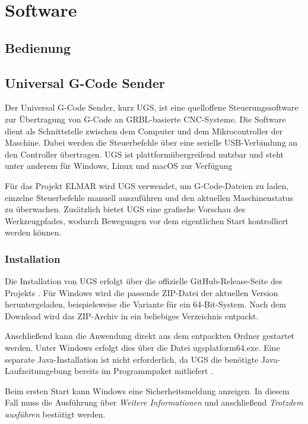 %
%

\chapter{Software}
\section {Bedienung}
\section{Universal G-Code Sender}

Der Universal G-Code Sender, kurz UGS, ist eine quelloffene Steuerungssoftware zur Übertragung von G-Code an GRBL-basierte CNC-Systeme. Die Software dient als Schnittstelle zwischen dem Computer und dem Mikrocontroller der Maschine. Dabei werden die Steuerbefehle über eine serielle USB-Verbindung an den Controller übertragen. UGS ist plattformübergreifend nutzbar und steht unter anderem für Windows, Linux und macOS zur Verfügung

Für das Projekt ELMAR wird UGS verwendet, um G-Code-Dateien zu laden, einzelne Steuerbefehle manuell auszuführen und den aktuellen Maschinenstatus zu überwachen. Zusätzlich bietet UGS eine grafische Vorschau des Werkzeugpfades, wodurch Bewegungen vor dem eigentlichen Start kontrolliert werden können.

\subsection{Installation}

Die Installation von UGS erfolgt über die offizielle GitHub-Release-Seite des Projekts . Für Windows wird die passende ZIP-Datei der aktuellen Version heruntergeladen, beispielsweise die Variante für ein 64-Bit-System. Nach dem Download wird das ZIP-Archiv in ein beliebiges Verzeichnis entpackt.

Anschließend kann die Anwendung direkt aus dem entpackten Ordner gestartet werden. Unter Windows erfolgt dies über die Datei ugsplatform64.exe. Eine separate Java-Installation ist nicht erforderlich, da UGS die benötigte Java-Laufzeitumgebung bereits im Programmpaket mitliefert .

Beim ersten Start kann Windows eine Sicherheitsmeldung anzeigen. In diesem Fall muss die Ausführung über \textit{Weitere Informationen} und anschließend \textit{Trotzdem ausführen} bestätigt werden.

